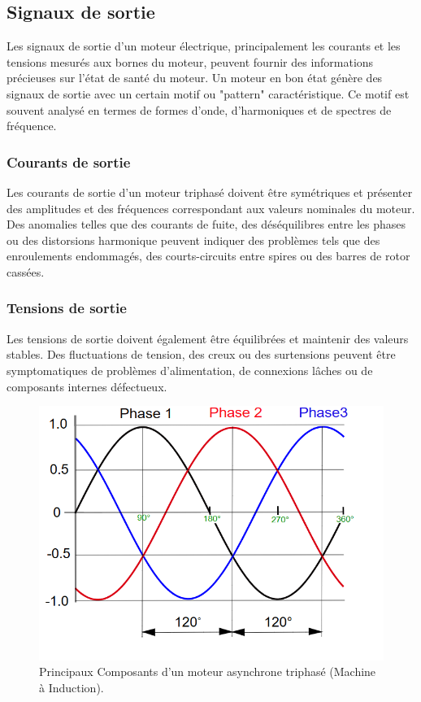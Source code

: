 \subsection*{Signaux de sortie}

Les signaux de sortie d'un moteur électrique, principalement les courants et
les tensions mesurés aux bornes du moteur, peuvent fournir des informations
précieuses sur l'état de santé du moteur. Un moteur en bon état génère des
signaux de sortie avec un certain motif ou "pattern" caractéristique. Ce motif
est souvent analysé en termes de formes d'onde, d'harmoniques et de spectres de
fréquence.

\subsubsection*{Courants de sortie}

Les courants de sortie d'un moteur triphasé doivent être symétriques et
présenter des amplitudes et des fréquences correspondant aux valeurs nominales
du moteur. Des anomalies telles que des courants de fuite, des déséquilibres
entre les phases ou des distorsions harmonique peuvent indiquer des problèmes
tels que des enroulements endommagés, des courts-circuits entre spires ou des
barres de rotor cassées.

\subsubsection*{Tensions de sortie}

Les tensions de sortie doivent également être équilibrées et maintenir des
valeurs stables. Des fluctuations de tension, des creux ou des surtensions
peuvent être symptomatiques de problèmes d'alimentation, de connexions lâches
ou de composants internes défectueux.

\begin{figure}[hbt!]
	\centering
	\includegraphics[width=12cm]{images_pfe/triphase.png}
	\caption{
		Principaux Composants d'un moteur asynchrone triphasé (Machine à Induction).}
	\label{fig:moteu-asynchrone}
\end{figure}
\FloatBarrier

